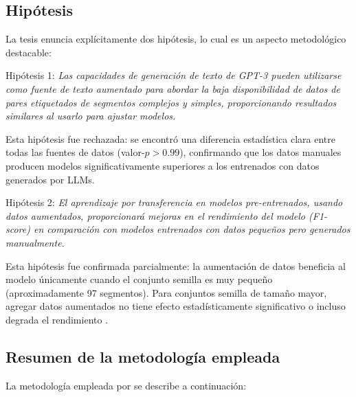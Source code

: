 \subsection{Hipótesis}

La tesis enuncia explícitamente dos hipótesis, lo cual es un aspecto metodológico destacable:

Hipótesis 1: \textit{Las capacidades de generación de texto de GPT-3 pueden utilizarse como fuente de texto aumentado para abordar la baja disponibilidad de datos de pares etiquetados de segmentos complejos y simples, proporcionando resultados similares al usarlo para ajustar modelos.}

Esta hipótesis fue rechazada: se encontró una diferencia estadística clara entre todas las fuentes de datos (valor-$p > 0.99$), confirmando que los datos manuales producen modelos significativamente superiores a los entrenados con datos generados por LLMs.

Hipótesis 2: \textit{El aprendizaje por transferencia en modelos pre-entrenados, usando datos aumentados, proporcionará mejoras en el rendimiento del modelo (F1-score) en comparación con modelos entrenados con datos pequeños pero generados manualmente.}

Esta hipótesis fue confirmada parcialmente: la aumentación de datos beneficia al modelo únicamente cuando el conjunto semilla es muy pequeño (aproximadamente 97 segmentos). Para conjuntos semilla de tamaño mayor, agregar datos aumentados no tiene efecto estadísticamente significativo o incluso degrada el rendimiento \cite{romero2024}.

\subsection{Resumen de la metodología empleada}

La metodología empleada por \cite{romero2024} se describe a continuación:

